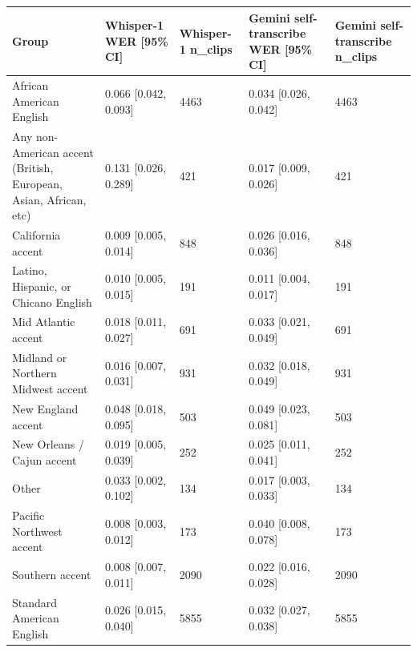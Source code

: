 \begin{tabular}{lllll}
\toprule
Group & Whisper-1 WER [95\% CI] & Whisper-1 n\_clips & Gemini self-transcribe WER [95\% CI] & Gemini self-transcribe n\_clips \\
\midrule
African American English & 0.066 [0.042, 0.093] & 4463 & 0.034 [0.026, 0.042] & 4463 \\
Any non-American accent (British, European, Asian, African, etc) & 0.131 [0.026, 0.289] & 421 & 0.017 [0.009, 0.026] & 421 \\
California accent & 0.009 [0.005, 0.014] & 848 & 0.026 [0.016, 0.036] & 848 \\
Latino, Hispanic, or Chicano English & 0.010 [0.005, 0.015] & 191 & 0.011 [0.004, 0.017] & 191 \\
Mid Atlantic accent & 0.018 [0.011, 0.027] & 691 & 0.033 [0.021, 0.049] & 691 \\
Midland or Northern Midwest accent & 0.016 [0.007, 0.031] & 931 & 0.032 [0.018, 0.049] & 931 \\
New England accent & 0.048 [0.018, 0.095] & 503 & 0.049 [0.023, 0.081] & 503 \\
New Orleans / Cajun accent & 0.019 [0.005, 0.039] & 252 & 0.025 [0.011, 0.041] & 252 \\
Other & 0.033 [0.002, 0.102] & 134 & 0.017 [0.003, 0.033] & 134 \\
Pacific Northwest accent & 0.008 [0.003, 0.012] & 173 & 0.040 [0.008, 0.078] & 173 \\
Southern accent & 0.008 [0.007, 0.011] & 2090 & 0.022 [0.016, 0.028] & 2090 \\
Standard American English & 0.026 [0.015, 0.040] & 5855 & 0.032 [0.027, 0.038] & 5855 \\
\bottomrule
\end{tabular}
